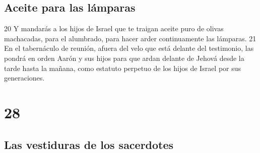\section{Aceite para las lámparas}

20 Y mandarás a los hijos de Israel que te traigan aceite puro de olivas machacadas, para el alumbrado, para hacer arder continuamente las lámparas.
21 En el tabernáculo de reunión, afuera del velo que está delante del testimonio, las pondrá en orden Aarón y sus hijos para que ardan delante de Jehová desde la tarde hasta la mañana, como estatuto perpetuo de los hijos de Israel por sus generaciones.

\chapter{28}

\section{Las vestiduras de los sacerdotes}

